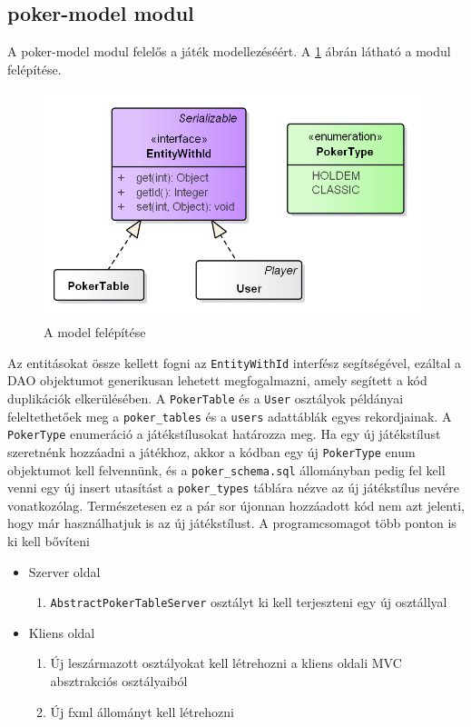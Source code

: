\subsection{poker-model modul} \label{sec:poker-model}
A poker-model modul felelős a játék modellezéséért. A \ref{fig:model} ábrán látható a modul felépítése. 
\begin{figure}[h!]
	\caption{A model felépítése}
	\label{fig:model}
	\centering
	\includegraphics[width=11cm]{developer-documentation/images/model.png}
\end{figure}
Az entitásokat össze kellett fogni az \texttt{EntityWithId} interfész segítségével, ezáltal a DAO objektumot generikusan lehetett megfogalmazni, amely segített a kód duplikációk elkerülésében. A \texttt{PokerTable} és a \texttt{User} osztályok példányai feleltethetőek meg a \texttt{poker\_tables} és a \texttt{users} adattáblák egyes rekordjainak. A \texttt{PokerType} enumeráció a játékstílusokat határozza meg. Ha egy új játékstílust szeretnénk hozzáadni a játékhoz, akkor a kódban egy új \texttt{PokerType} enum objektumot kell felvennünk, és a \texttt{poker\_schema.sql} állományban pedig fel kell venni egy új insert utasítást a \texttt{poker\_types} táblára nézve az új játékstílus nevére vonatkozólag. Természetesen ez a pár sor újonnan hozzáadott kód nem azt jelenti, hogy már használhatjuk is az új játékstílust. A programcsomagot több ponton is ki kell bővíteni
\begin{itemize}[leftmargin=2cm]
	\item Szerver oldal
		\begin{enumerate}
			\item \texttt{AbstractPokerTableServer} osztályt ki kell terjeszteni egy új osztállyal
		\end{enumerate}
	\item Kliens oldal
		\begin{enumerate}
			\item Új leszármazott osztályokat kell létrehozni a kliens oldali MVC absztrakciós osztályaiból
			\item Új fxml állományt kell létrehozni
		\end{enumerate}
\end{itemize}

